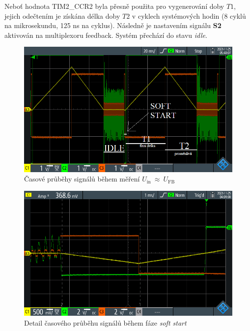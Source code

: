 \documentclass[twoside]{article}
\begin{document}
Neboť hodnota TIM2\_CCR2 byla přesně použita pro vygenerování doby $T1$, jejich odečtením je získána délka doby $T2$ v cyklech systémových hodin (8 cyklů na mikrosekundu, 125 ns na cyklus).
Následně je nastavením signálu \textbf{S2} aktivován na multiplexoru feedback. Systém přechází do stavu \textit{idle}.


\begin{figure}[htbp]
    \centering
    \includegraphics[width=\linewidth]{overview.png}
    \caption{Časové průběhy signálů během měření $U_{\text{in}}~\approx~U_{\text{FB}}$}
    \label{fig:overview}
\end{figure}

\begin{figure}[htbp]
    \centering
    \includegraphics[width=\linewidth]{soft_start.png}
    \caption{Detail časového průběhu signálů během fáze \textit{soft start}}
    \label{fig:soft_start}
\end{figure}
\end{document}
